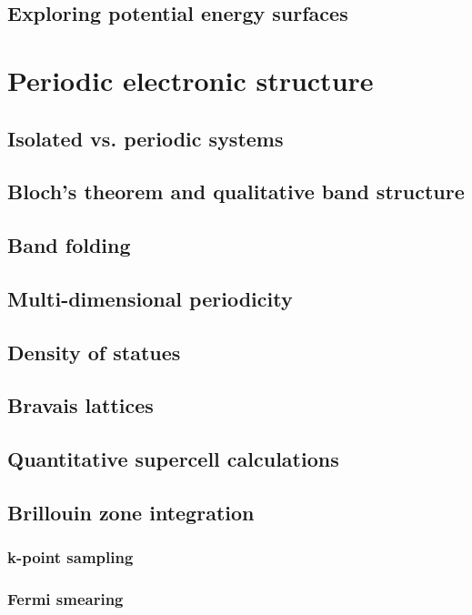 \documentclass[11pt]{article}
\begin{document}
\subsection{Exploring potential energy surfaces}
\label{sec-8-10}
\newpage
\section{Periodic electronic structure}
\label{sec-9}
\subsection{Isolated vs. periodic systems}
\label{sec-9-1}
\subsection{Bloch's theorem and qualitative band structure}
\label{sec-9-2}
\subsection{Band folding}
\label{sec-9-3}
\subsection{Multi-dimensional periodicity}
\label{sec-9-4}
\subsection{Density of statues}
\label{sec-9-5}
\subsection{Bravais lattices}
\label{sec-9-6}
\subsection{Quantitative supercell calculations}
\label{sec-9-7}
\subsection{Brillouin zone integration}
\label{sec-9-8}
\subsubsection{k-point sampling}
\label{sec-9-8-1}
\subsubsection{Fermi smearing}
\label{sec-9-8-2}
\newpage
\end{document}
